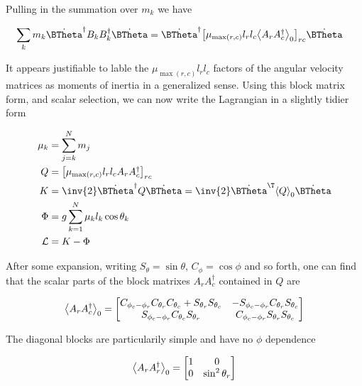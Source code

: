 Pulling in the summation over $m_k$ we have

\begin{align}\label{eqn:multiPendulumSpherical2:boo15}
\sum_k m_k
\dot{\BTheta}^\dagger
B_k B_k^\dagger
\dot{\BTheta}
&=
\dot{\BTheta}^\dagger
{\begin{bmatrix}
\mu_{\max(r,c)} l_r l_c \gpgradezero{A_r A_c^\dagger}
\end{bmatrix}}_{rc}
\dot{\BTheta}
\end{align}

It appears justifiable to lable the $\mu_{\max(r,c)} l_r l_c$ factors of the angular velocity matrices as moments of inertia in a generalized sense.  Using this block matrix form, and scalar selection, we can now write the Lagrangian in a slightly tidier form

\begin{align}\label{eqn:multiPendulumSpherical2:boo5}
\mu_k &= \sum_{j=k}^N m_j \\
Q &= 
{\begin{bmatrix}
\mu_{\max(r,c)} l_r l_c A_r A_c^\dagger
\end{bmatrix}}_{rc} \\
K &=
\inv{2} \dot{\BTheta}^\dagger Q
\dot{\BTheta} 
=\inv{2} \dot{\BTheta}^\T \gpgradezero{Q}
\dot{\BTheta} \\
\Phi &=
g \sum_{k=1}^N \mu_k l_k \cos\theta_k \\
\LL &= K - \Phi
\end{align}

After some expansion, writing $S_\theta = \sin\theta$, $C_\phi = \cos\phi$ and so forth, one can find that the scalar parts of the block matrixes $A_r A_c^\dagger$ contained in $Q$ are

\begin{align}\label{eqn:multiPendulumSpherical2:boo20}
{\left\langle{{A_r A_c^\dagger}}\right\rangle}_{0}
=
\begin{bmatrix}
C_{\phi_c - \phi_r} 
C_{\theta_r}
C_{\theta_c}
+S_{\theta_r}
S_{\theta_c} &
-S_{\phi_c - \phi_r} C_{\theta_r} S_{\theta_c} \\
S_{\phi_c - \phi_r} C_{\theta_c} S_{\theta_r} &
C_{\phi_c - \phi_r} S_{\theta_r} S_{\theta_c}
\end{bmatrix}
\end{align}

The diagonal blocks are particularily simple and have no $\phi$ dependence

\begin{align}\label{eqn:multiPendulumSpherical2:boo20d}
{\left\langle{{A_r A_r^\dagger}}\right\rangle}_{0}
=
\begin{bmatrix}
1 & 0 \\
0 & \sin^2 \theta_r
\end{bmatrix}
\end{align}

